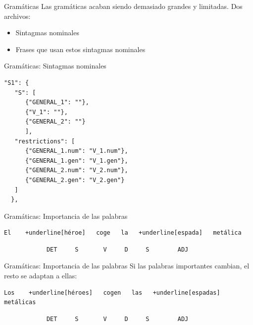 \begin{frame}[t, fragile]{Gramáticas}
	Las gramáticas acaban siendo demasiado grandes y limitadas. Dos archivos:
	\begin{itemize}
		\item Sintagmas nominales
		\item<+-| alert@+> Frases que usan estos sintagmas nominales
	\end{itemize}
\end{frame}

\begin{frame}[t, fragile]{Gramáticas: Sintagmas nominales}
	\begin{Verbatim}
"S1": {
   "S": [
      {"GENERAL_1": ""},
      {"V_1": ""},
      {"GENERAL_2": ""}
      ],
   "restrictions": [
      {"GENERAL_1.num": "V_1.num"},
      {"GENERAL_1.gen": "V_1.gen"},
      {"GENERAL_2.num": "V_2.num"},
      {"GENERAL_2.gen": "V_2.gen"}
   ]
  },
	\end{Verbatim}
\end{frame}

\begin{frame}[t, fragile]{Gramáticas: Importancia de las palabras}
	\vspace*{\fill}
		\begin{Verbatim}[commandchars=+\[\]]
	El    +underline[héroe]   coge   la   +underline[espada]   metálica
		\end{Verbatim}
		\begin{verbatim}
			DET     S       V     D     S        ADJ
		\end{verbatim}
	\vspace*{\fill}
\end{frame}

\begin{frame}[t, fragile]{Gramáticas: Importancia de las palabras}
	Si las palabras importantes cambian, el resto se adaptan a ellas:
	\vspace*{\fill}
		\begin{Verbatim}[commandchars=+\[\]]
	Los    +underline[héroes]   cogen   las   +underline[espadas]   metálicas
		\end{Verbatim}
		\begin{verbatim}
			DET     S       V     D     S        ADJ
		\end{verbatim}
	\vspace*{\fill}
\end{frame}


